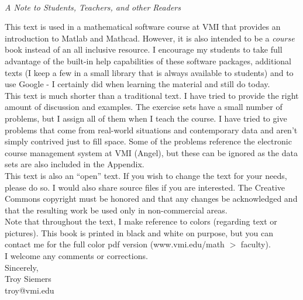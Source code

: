 \Huge
{}\\
\large
\emph{A Note to Students, Teachers, and other Readers}
\vspace{1in}
\normalsize

This text is used in a mathematical software course at VMI that provides an introduction to Matlab and Mathcad.  However, it is also intended to be a \emph{course} book instead of an all inclusive resource.  I encourage my students to take full advantage of the built-in help capabilities of these software packages, additional texts (I keep a few in a small library that is always available to students) and to use Google - I certainly did when learning the material and still do today. \\ 

This text is much shorter than a traditional text.  I have tried to provide the right amount of discussion and examples.  The exercise sets have a small number of problems, but I assign all of them when I teach the course.  I have tried to give problems that come from real-world situations and contemporary data and aren't simply contrived just to fill space.  Some of the problems reference the electronic course management system at VMI (Angel), but these can be ignored as the data sets are also included in the Appendix. \\

This text is also an ``open'' text.  If you wish to change the text for your needs, please do so.  I would also share source files if you are interested.  The Creative Commons copyright must be honored and that any changes be acknowledged and that the resulting work be used only in non-commercial areas.\\

Note that throughout the text, I make reference to colors (regarding text or pictures).  This book is printed in black and white on purpose, but you can contact me for the full color pdf version (www.vmi.edu/math $>$ faculty).\\

I welcome any comments or corrections.\\

Sincerely,\\

Troy Siemers\\
\indent troy@vmi.edu



